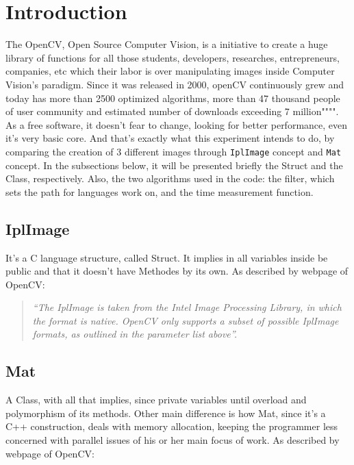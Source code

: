 \section{Introduction}\label{sec:2}
    The OpenCV, Open Source Computer Vision, is a initiative to create a huge library of functions for all those students, developers, researches, entrepreneurs, companies, etc which their labor is over manipulating images inside Computer Vision's paradigm. Since it was released in 2000, openCV continuously grew and today has more than 2500 optimized algorithms, more than 47 thousand people of user community and estimated number of downloads exceeding 7 million"""".\\
    
    As a free software, it doesn't fear to change, looking for better performance, even it's very basic core. And that's exactly what this experiment intends to do, by comparing the creation of 3 different images through \texttt{IplImage} concept and \texttt{Mat} concept. In the subsections below, it will be presented briefly the Struct and the Class, respectively. Also, the two algorithms used in the code: the filter, which sets the path for languages work on, and the time measurement function.   

    \subsection{IplImage}
        It's a C language structure, called Struct. It implies in all variables inside be public and that it doesn't have Methodes by its own. As described by webpage of OpenCV:
        \begin{quotation}
        
        \emph{
        ``The IplImage is taken from the Intel Image Processing Library, in which the format is native. OpenCV only supports a subset of possible IplImage formats, as outlined in the parameter list above''.}
        \end{quotation} 

    \subsection{Mat}
        A Class, with all that implies, since private variables until overload and polymorphism of its methods. Other main difference is how Mat, since it's a C++ construction, deals with memory allocation, keeping the programmer less concerned with parallel issues of his or her main focus of work. As described by webpage of OpenCV: 

